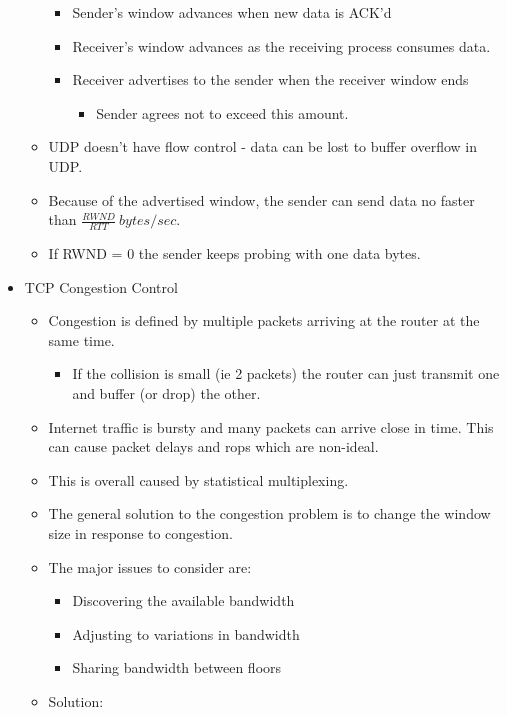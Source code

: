 \documentclass[]{article}
\providecommand{\tightlist}{%
  \setlength{\itemsep}{0pt}\setlength{\parskip}{0pt}}
\begin{document}
\begin{itemize}
\begin{itemize}
    \begin{itemize}
    \tightlist
    \item
      Sender's window advances when new data is ACK'd
    \item
      Receiver's window advances as the receiving process consumes data.
    \item
      Receiver advertises to the sender when the receiver window ends

      \begin{itemize}
      \tightlist
      \item
        Sender agrees not to exceed this amount.
      \end{itemize}
    \end{itemize}
  \item
    UDP doesn't have flow control - data can be lost to buffer overflow
    in UDP.
  \item
    Because of the advertised window, the sender can send data no faster
    than \(\frac{RWND}{RTT}\ bytes/sec\).
  \item
    If RWND = 0 the sender keeps probing with one data bytes.
  \end{itemize}
\item
  TCP Congestion Control

  \begin{itemize}
  \tightlist
  \item
    Congestion is defined by multiple packets arriving at the router at
    the same time.

    \begin{itemize}
    \tightlist
    \item
      If the collision is small (ie 2 packets) the router can just
      transmit one and buffer (or drop) the other.
    \end{itemize}
  \item
    Internet traffic is bursty and many packets can arrive close in
    time. This can cause packet delays and rops which are non-ideal.
  \item
    This is overall caused by statistical multiplexing.
  \item
    The general solution to the congestion problem is to change the
    window size in response to congestion.
  \item
    The major issues to consider are:

    \begin{itemize}
    \tightlist
    \item
      Discovering the available bandwidth
    \item
      Adjusting to variations in bandwidth
    \item
      Sharing bandwidth between floors
    \end{itemize}
  \item
    Solution:


\end{itemize}
\end{itemize}
\end{document}
